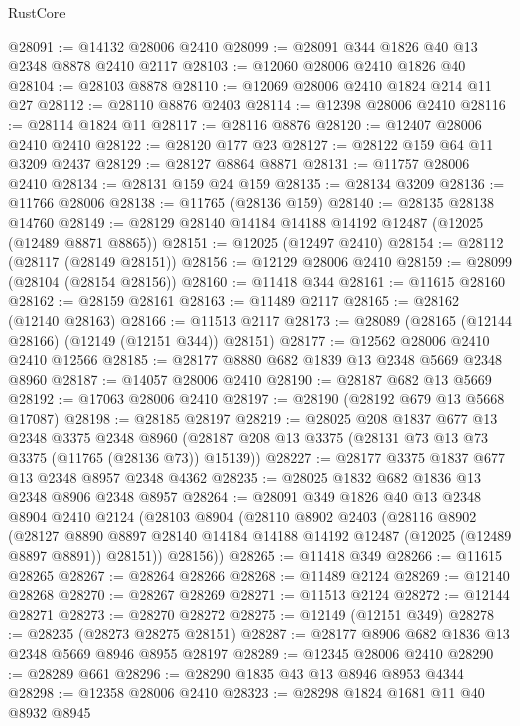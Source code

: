 \begin{lexlean}{RustCore}
\begin{coremodule}
@28091 := @14132 @28006 @2410
@28099 := @28091 @344 @1826 @40 @13 @2348 @8878 @2410 @2117
@28103 := @12060 @28006 @2410 @1826 @40
@28104 := @28103 @8878
@28110 := @12069 @28006 @2410 @1824 @214 @11 @27
@28112 := @28110 @8876 @2403
@28114 := @12398 @28006 @2410
@28116 := @28114 @1824 @11
@28117 := @28116 @8876
@28120 := @12407 @28006 @2410 @2410
@28122 := @28120 @177 @23
@28127 := @28122 @159 @64 @11 @3209 @2437
@28129 := @28127 @8864 @8871
@28131 := @11757 @28006 @2410
@28134 := @28131 @159 @24 @159
@28135 := @28134 @3209
@28136 := @11766 @28006
@28138 := @11765 (@28136 @159)
@28140 := @28135 @28138 @14760
@28149 := @28129 @28140 @14184 @14188 @14192 @12487 (@12025 (@12489 @8871 @8865))
@28151 := @12025 (@12497 @2410)
@28154 := @28112 (@28117 (@28149 @28151))
@28156 := @12129 @28006 @2410
@28159 := @28099 (@28104 (@28154 @28156))
@28160 := @11418 @344
@28161 := @11615 @28160
@28162 := @28159 @28161
@28163 := @11489 @2117
@28165 := @28162 (@12140 @28163)
@28166 := @11513 @2117
@28173 := @28089 (@28165 (@12144 @28166) (@12149 (@12151 @344)) @28151)
@28177 := @12562 @28006 @2410 @2410 @12566
@28185 := @28177 @8880 @682 @1839 @13 @2348 @5669 @2348 @8960
@28187 := @14057 @28006 @2410
@28190 := @28187 @682 @13 @5669
@28192 := @17063 @28006 @2410
@28197 := @28190 (@28192 @679 @13 @5668 @17087)
@28198 := @28185 @28197
@28219 := @28025
    @208
    @1837
    @677
    @13
    @2348
    @3375
    @2348
    @8960
    (@28187 @208 @13 @3375 (@28131 @73 @13 @73 @3375 (@11765 (@28136 @73)) @15139))
@28227 := @28177 @3375 @1837 @677 @13 @2348 @8957 @2348 @4362
@28235 := @28025 @1832 @682 @1836 @13 @2348 @8906 @2348 @8957
@28264 := @28091
    @349
    @1826
    @40
    @13
    @2348
    @8904
    @2410
    @2124
    (@28103
      @8904
      (@28110
        @8902
        @2403
        (@28116
          @8902
          (@28127
            @8890
            @8897
            @28140
            @14184
            @14188
            @14192
            @12487
            (@12025 (@12489 @8897 @8891))
            @28151))
        @28156))
@28265 := @11418 @349
@28266 := @11615 @28265
@28267 := @28264 @28266
@28268 := @11489 @2124
@28269 := @12140 @28268
@28270 := @28267 @28269
@28271 := @11513 @2124
@28272 := @12144 @28271
@28273 := @28270 @28272
@28275 := @12149 (@12151 @349)
@28278 := @28235 (@28273 @28275 @28151)
@28287 := @28177 @8906 @682 @1836 @13 @2348 @5669 @8946 @8955 @28197
@28289 := @12345 @28006 @2410
@28290 := @28289 @661
@28296 := @28290 @1835 @43 @13 @8946 @8953 @4344
@28298 := @12358 @28006 @2410
@28323 := @28298
    @1824
    @1681
    @11
    @40
    @8932
    @8945

\end{coremodule}
\end{lexlean}
